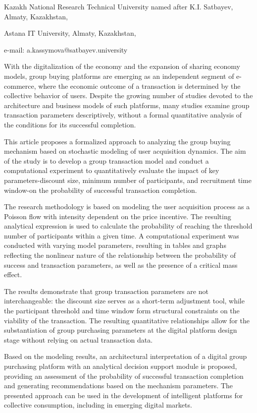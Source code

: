 \begin{affil}
Kazakh National Research Technical University named after K.I. Satbayev, Almaty, Kazakhstan,

Astana IT University, Almaty, Kazakhstan,

e-mail: a.kassymova@satbayev.university
\end{affil}

With the digitalization of the economy and the expansion of sharing
economy models, group buying platforms are emerging as an independent
segment of e-commerce, where the economic outcome of a transaction is
determined by the collective behavior of users. Despite the growing
number of studies devoted to the architecture and business models of
such platforms, many studies examine group transaction parameters
descriptively, without a formal quantitative analysis of the conditions
for its successful comple\-tion.

This article proposes a formalized approach to analyzing the group
buying mechanism based on stochas\-tic modeling of user acquisition
dynamics. The aim of the study is to develop a group transaction model
and conduct a computational experiment to quantitatively evaluate the
impact of key parameters-discount size, minimum number of participants,
and recruitment time window-on the probability of successful transaction
completion.

The research methodology is based on modeling the user acquisition
process as a Poisson flow with intensity dependent on the price
incentive. The resulting analytical expression is used to calculate the
probability of reaching the threshold number of participants within a
given time. A computational experi\-ment was conducted with varying model
parameters, resulting in tables and graphs reflecting the nonlinear
nature of the relationship between the probability of success and
transaction parameters, as well as the presence of a critical mass
effect.

The results demonstrate that group transaction parameters are not
interchangeable: the discount size serves as a short-term adjustment
tool, while the participant threshold and time window form structural
constraints on the viability of the transaction. The resulting
quantitative relationships allow for the substan\-tiation of group
purchasing parameters at the digital platform design stage without
relying on actual transaction data.

Based on the modeling results, an architectural interpretation of a
digital group purchasing platform with an analytical decision support
module is proposed, providing an assessment of the probability of
successful transaction completion and generating recommendations based
on the mechanism parameters. The presented approach can be used in the
development of intelligent platforms for collective consumption,
including in emerging digital markets.

